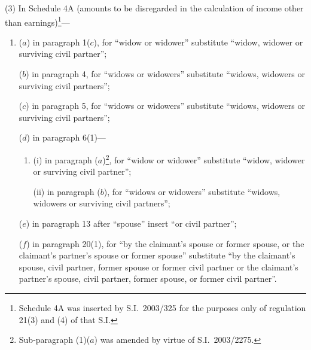 \documentclass[12pt,a4paper]{article}
\begin{document}
(3) In Schedule 4A (amounts to be disregarded in the calculation of income other than earnings)\footnote{Schedule 4A was inserted by S.I.\ 2003/325 for the purposes only of regulation 21(3) and (4) of that S.I.}—
\begin{enumerate}\item[]
($a$) in paragraph 1($c$), for “widow or widower” substitute “widow, widower or surviving civil partner”;

($b$) in paragraph 4, for “widows or widowers” substitute “widows, widowers or surviving civil partners”;

($c$) in paragraph 5, for “widows or widowers” substitute “widows, widowers or surviving civil partners”;

($d$) in paragraph 6(1)—
\begin{enumerate}\item[]
(i) in paragraph ($a$)\footnote{Sub-paragraph (1)($a$) was amended by virtue of S.I.\ 2003/2275.}, for “widow or widower” substitute “widow, widower or surviving civil partner”;

(ii) in paragraph ($b$), for “widows or widowers” substitute “widows, widowers or surviving civil partners”;
\end{enumerate}

($e$) in paragraph 13 after “spouse” insert “or civil partner”;

($f$) in paragraph 20(1), for “by the claimant’s spouse or former spouse, or the claimant’s partner’s spouse or former spouse” substitute “by the claimant’s spouse, civil partner, former spouse or former civil partner or the claimant’s partner’s spouse, civil partner, former spouse, or former civil partner”.
\end{enumerate}
\end{document}
